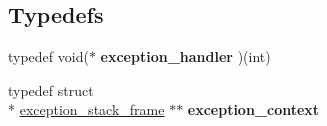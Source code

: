 \subsection*{Typedefs}
\begin{DoxyCompactItemize}
\item 
\hypertarget{group__exceptions_gaa981e1616ab85fbe3146dc0cfd01d98a}{typedef void($\ast$ {\bfseries exception\-\_\-handler} )(int)}\label{group__exceptions_gaa981e1616ab85fbe3146dc0cfd01d98a}

\item 
\hypertarget{group__exceptions_ga644495f4913e96a83cdf2779fd813974}{typedef struct \\*
\hyperlink{structexception__stack__frame}{exception\-\_\-stack\-\_\-frame} $\ast$$\ast$ {\bfseries exception\-\_\-context}}\label{group__exceptions_ga644495f4913e96a83cdf2779fd813974}

\end{DoxyCompactItemize}
